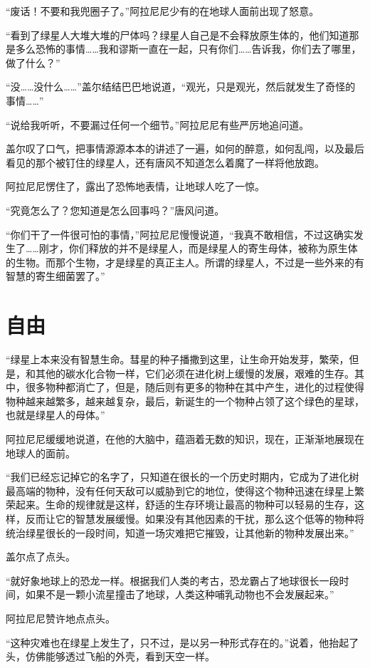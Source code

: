 “废话！不要和我兜圈子了。”阿拉尼尼少有的在地球人面前出现了怒意。

“看到了绿星人大堆大堆的尸体吗？绿星人自己是不会释放原生体的，他们知道那是多么恐怖的事情……我和谬斯一直在一起，只有你们……告诉我，你们去了哪里，做了什么？”

“没……没什么……”盖尔结结巴巴地说道，“观光，只是观光，然后就发生了奇怪的事情……”

“说给我听听，不要漏过任何一个细节。”阿拉尼尼有些严厉地追问道。

盖尔叹了口气，把事情源源本本的讲述了一遍，如何的醉意，如何乱闯，以及最后看见的那个被钉住的绿星人，还有唐风不知道怎么着魔了一样将他放跑。

阿拉尼尼愣住了，露出了恐怖地表情，让地球人吃了一惊。

“究竟怎么了？您知道是怎么回事吗？”唐风问道。

“你们干了一件很可怕的事情，”阿拉尼尼慢慢说道，“我真不敢相信，不过这确实发生了……刚才，你们释放的并不是绿星人，而是绿星人的寄生母体，被称为原生体的生物。而那个生物，才是绿星的真正主人。所谓的绿星人，不过是一些外来的有智慧的寄生细菌罢了。”

\chapter{自由}

“绿星上本来没有智慧生命。彗星的种子播撒到这里，让生命开始发芽，繁荣，但是，和其他的碳水化合物一样，它们必须在进化树上缓慢的发展，艰难的生存。其中，很多物种都消亡了，但是，随后则有更多的物种在其中产生，进化的过程使得物种越来越繁多，越来越复杂，最后，新诞生的一个物种占领了这个绿色的星球，也就是绿星人的母体。”

阿拉尼尼缓缓地说道，在他的大脑中，蕴涵着无数的知识，现在，正渐渐地展现在地球人的面前。

“我们已经忘记掉它的名字了，只知道在很长的一个历史时期内，它成为了进化树最高端的物种，没有任何天敌可以威胁到它的地位，使得这个物种迅速在绿星上繁荣起来。生命的规律就是这样，舒适的生存环境让最高的物种可以轻易的生存，这样，反而让它的智慧发展缓慢。如果没有其他因素的干扰，那么这个低等的物种将统治绿星很长的一段时间，知道一场灾难把它摧毁，让其他新的物种发展出来。”

盖尔点了点头。

“就好象地球上的恐龙一样。根据我们人类的考古，恐龙霸占了地球很长一段时间，如果不是一颗小流星撞击了地球，人类这种哺乳动物也不会发展起来。”

阿拉尼尼赞许地点点头。

“这种灾难也在绿星上发生了，只不过，是以另一种形式存在的。”说着，他抬起了头，仿佛能够透过飞船的外壳，看到天空一样。

